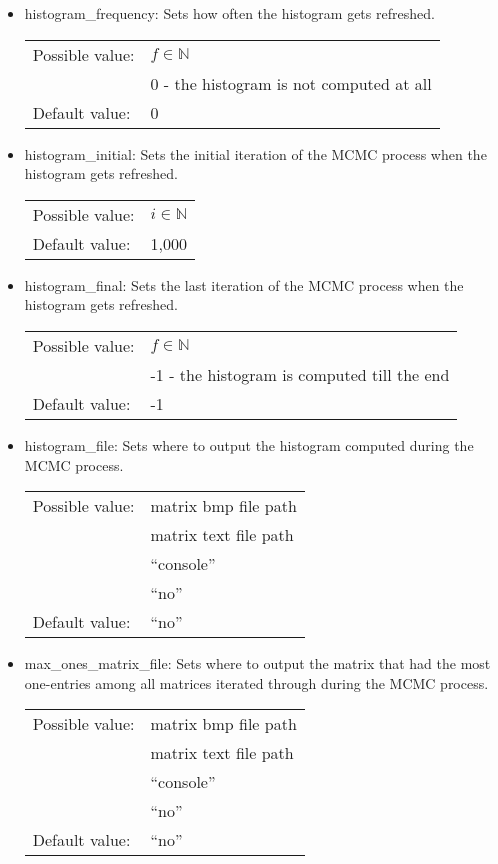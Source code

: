 \begin{itemize}
\item histogram\_frequency: Sets how often the histogram gets refreshed.

\begin{tabular}{ll}
Possible value: & $f\in\mathbb{N}$ \\
& 0 - the histogram is not computed at all \\
Default value: & 0
\end{tabular}

\item histogram\_initial: Sets the initial iteration of the MCMC process when the histogram gets refreshed.

\begin{tabular}{ll}
Possible value: & $i\in\mathbb{N}$ \\
Default value: & 1,000
\end{tabular}

\item histogram\_final: Sets the last iteration of the MCMC process when the histogram gets refreshed.

\begin{tabular}{ll}
Possible value: & $f\in\mathbb{N}$ \\
& -1 - the histogram is computed till the end \\
Default value: & -1
\end{tabular}

\item histogram\_file: Sets where to output the histogram computed during the MCMC process.

\begin{tabular}{ll}
Possible value: & matrix bmp file path \\
& matrix text file path \\
& ``console'' \\
& ``no'' \\
Default value: & ``no''
\end{tabular}

\item max\_ones\_matrix\_file: Sets where to output the matrix that had the most one-entries among all matrices iterated through during the MCMC process.

\begin{tabular}{ll}
Possible value: & matrix bmp file path \\
& matrix text file path \\
& ``console'' \\
& ``no'' \\
Default value: & ``no''
\end{tabular}

\end{itemize}
